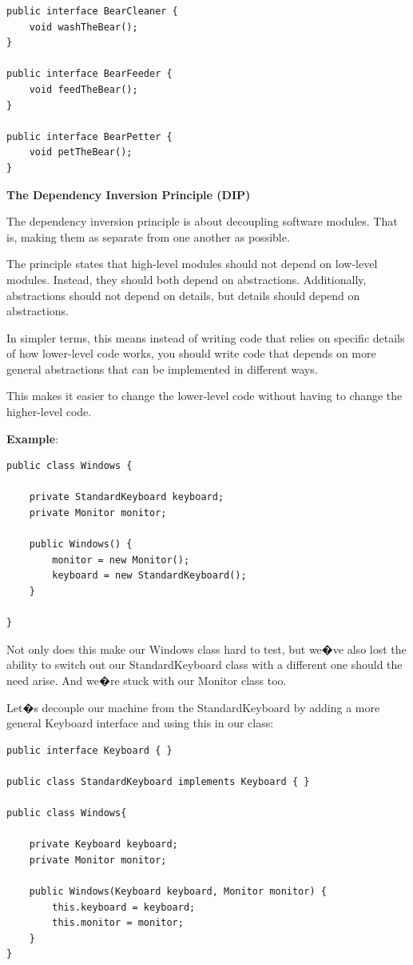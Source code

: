 \begin{lstlisting}
public interface BearCleaner {
    void washTheBear();
}

public interface BearFeeder {
    void feedTheBear();
}

public interface BearPetter {
    void petTheBear();
}
\end{lstlisting}


\medskip
\begin{center}
\textbf{The Dependency Inversion Principle (DIP)}
\end{center}


The dependency inversion principle is about decoupling software modules. That is, making them as separate from one another as possible.

The principle states that high-level modules should not depend on low-level modules. Instead, they should both depend on abstractions. Additionally, abstractions should not depend on details, but details should depend on abstractions.

In simpler terms, this means instead of writing code that relies on specific details of how lower-level code works, you should write code that depends on more general abstractions that can be implemented in different ways.

This makes it easier to change the lower-level code without having to change the higher-level code.

\textbf{Example}:

\begin{lstlisting}
public class Windows {

    private StandardKeyboard keyboard;
    private Monitor monitor;

    public Windows() {
        monitor = new Monitor();
        keyboard = new StandardKeyboard();
    }

}
\end{lstlisting}

Not only does this make our Windows class hard to test, but we�ve also lost the ability to switch out our StandardKeyboard class with a different one should the need arise. And we�re stuck with our Monitor class too.

Let�s decouple our machine from the StandardKeyboard by adding a more general Keyboard interface and using this in our class:

\begin{lstlisting}
public interface Keyboard { }

public class StandardKeyboard implements Keyboard { }

public class Windows{

    private Keyboard keyboard;
    private Monitor monitor;

    public Windows(Keyboard keyboard, Monitor monitor) {
        this.keyboard = keyboard;
        this.monitor = monitor;
    }
}
\end{lstlisting}


